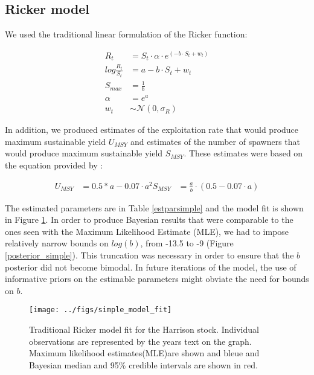 \documentclass{article}
\begin{document}
\subsection{Ricker model}

We used the traditional linear formulation of the Ricker function:

\begin{align} 
R_t &= S_t \cdot \alpha \cdot e^{(-b\cdot S_t + w_t)}  \\ 
log\frac{R_t}{S_t} &= a-b \cdot S_t + w_t \\
S_{max} &= \frac{1}{b}\\
\alpha &= e^{a}\\
w_t &\sim \mathcal{N}(0,\sigma_R)
\end{align}

In addition, we produced estimates of the exploitation rate that would produce maximum sustainable yield $U_{MSY}$ and estimates of the number of spawners that would produce maximum sustainable yield $S_{MSY}$. These estimates were based on the equation provided by \citet{hilborn_quantitative_1992}: 

\begin{align} 
U_{MSY} &= 0.5*a-0.07\cdot a^2
S_{MSY} &= \frac{a}{b} \cdot (0.5-0.07 \cdot a)
\end{align}

The estimated parameters are in Table \ref{estparsimple} and the model fit is shown in Figure \ref{simple_fit}. In order to produce Bayesian results that were comparable to the ones seen with the Maximum Likelihood Estimate (MLE), we had to impose relatively narrow bounds on $log(b)$, from -13.5 to -9 (Figure \ref{posterior_simple}). This truncation was necessary in order to ensure that the $b$ posterior did not become bimodal. In future iterations of the model, the use of informative priors on the estimable parameters might obviate the need for bounds on $b$.  





\begin{figure}[ht]
  \centering
  \texttt{[image: ../figs/simple\_model\_fit]}
  \caption{Traditional Ricker model fit for the Harrison stock. Individual observations are represented by the years text on the graph. Maximum likelihood estimates(MLE)are shown and bleue and Bayesian median and 95\% credible intervals are shown in red. }
\label{simple_fit}
\end{figure}
\end{document}
